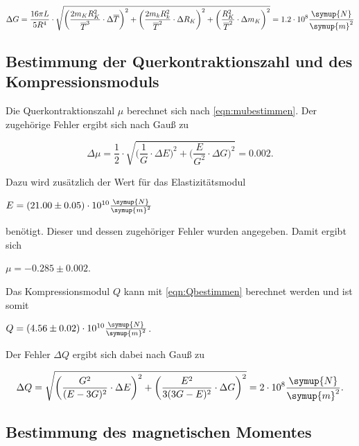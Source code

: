 \begin{equation}
 \Delta G = \frac{16 \pi L}{5 R^4} \cdot \sqrt{ \bigg( \frac{2 m_K R_K^2}{\overline{T}^3} \cdot \Delta \overline{T} \bigg)^2 + \bigg( \frac{2 m_k R_k^2}{\overline{T}^2} \cdot \Delta R_K \bigg)^2 + \bigg( \frac{R_K^2}{\overline{T}^2} \cdot \Delta m_K \bigg)^2} = 1.2 \cdot 10^{8} \frac{\symup{N}}{\symup{m}^2}
\end{equation}

\subsection{Bestimmung der Querkontraktionszahl und des Kompressionsmoduls}

Die Querkontraktionszahl $\mu$ berechnet sich nach \eqref{eqn:mubestimmen}. Der zugehörige Fehler ergibt sich nach Gauß zu

\begin{equation}
  \Delta \mu = \frac{1}{2} \cdot \sqrt{ \bigg( \frac{1}{G} \cdot \Delta E \bigg)^2 + \bigg( \frac{E}{G^2} \cdot \Delta G \bigg)^2} = 0.002.
\end{equation}

Dazu wird zusätzlich der Wert für das Elastizitätsmodul 

\vspace{.5em}
\centerline{$E = (21.00 \pm 0.05) \cdot 10^{10} \frac{\symup{N}}{\symup{m}^2}$}
\vspace{.5em}

benötigt. Dieser und dessen zugehöriger Fehler wurden angegeben. Damit ergibt sich 

\centerline{$\mu = -0.285 \pm 0.002$.}
Das Kompressionsmodul $Q$ kann mit \eqref{eqn:Qbestimmen} berechnet werden und ist somit

\vspace{.5em}
\centerline{$Q = (4.56 \pm 0.02) \cdot 10^{10} \frac{\symup{N}}{\symup{m}^2}$.}
\vspace{.5em}

Der Fehler $\Delta Q$ ergibt sich dabei nach Gauß zu

\begin{equation}
  \Delta Q = \sqrt{ \bigg( \frac{G^2}{(E - 3G)^2} \cdot \Delta E \bigg)^2 + \bigg( \frac{E^2}{3(3G - E)^2} \cdot \Delta G \bigg)^2} = 2 \cdot 10^{8} \frac{\symup{N}}{\symup{m}^2}.
\end{equation}


\subsection{Bestimmung des magnetischen Momentes}

